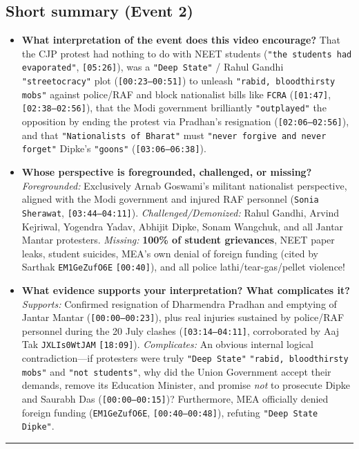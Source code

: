 \documentclass[10pt,a4paper]{article}
\begin{document}
\subsection*{Short summary (Event 2)}
\begin{itemize}[leftmargin=1.5em, itemsep=3pt, topsep=4pt]
  \item \textbf{What interpretation of the event does this video encourage?} That the CJP protest had nothing to do with NEET students (\texttt{"the students had evaporated"}, \texttt{[05:26]}), was a \texttt{"Deep State"} / Rahul Gandhi \texttt{"streetocracy"} plot (\texttt{[00:23--00:51]}) to unleash \texttt{"rabid, bloodthirsty mobs"} against police/RAF and block nationalist bills like \texttt{FCRA} (\texttt{[01:47]}, \texttt{[02:38--02:56]}), that the Modi government brilliantly \texttt{"outplayed"} the opposition by ending the protest via Pradhan's resignation (\texttt{[02:06--02:56]}), and that \texttt{"Nationalists of Bharat"} must \texttt{"never forgive and never forget"} Dipke's \texttt{"goons"} (\texttt{[03:06--06:38]}).
  \item \textbf{Whose perspective is foregrounded, challenged, or missing?} \textit{Foregrounded:} Exclusively Arnab Goswami's militant nationalist perspective, aligned with the Modi government and injured RAF personnel (\texttt{Sonia Sherawat}, \texttt{[03:44--04:11]}). \textit{Challenged/Demonized:} Rahul Gandhi, Arvind Kejriwal, Yogendra Yadav, Abhijit Dipke, Sonam Wangchuk, and all Jantar Mantar protesters. \textit{Missing:} \textbf{100\% of student grievances}, NEET paper leaks, student suicides, MEA's own denial of foreign funding (cited by Sarthak \texttt{EM1GeZufO6E} \texttt{[00:40]}), and all police lathi/tear-gas/pellet violence!
  \item \textbf{What evidence supports your interpretation? What complicates it?} \textit{Supports:} Confirmed resignation of Dharmendra Pradhan and emptying of Jantar Mantar (\texttt{[00:00--00:23]}), plus real injuries sustained by police/RAF personnel during the 20 July clashes (\texttt{[03:14--04:11]}, corroborated by Aaj Tak \texttt{JXLIs0WtJAM} \texttt{[18:09]}). \textit{Complicates:} An obvious internal logical contradiction---if protesters were truly \texttt{"Deep State"} \texttt{"rabid, bloodthirsty mobs"} and \texttt{"not students"}, why did the Union Government accept their demands, remove its Education Minister, and promise \textit{not} to prosecute Dipke and Saurabh Das (\texttt{[00:00--00:15]})? Furthermore, MEA officially denied foreign funding (\texttt{EM1GeZufO6E}, \texttt{[00:40--00:48]}), refuting \texttt{"Deep State Dipke"}.
\end{itemize}
\vspace{4pt}\noindent\rule{\textwidth}{0.4pt}\vspace{4pt}
\end{document}
